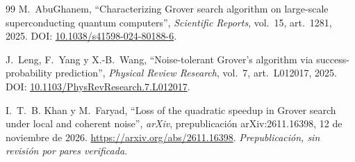 \documentclass[11pt,a4paper]{article}
\begin{document}
\begin{thebibliography}{99}
M.~AbuGhanem, ``Characterizing Grover search algorithm on large-scale superconducting quantum computers'', \emph{Scientific Reports}, vol.~15, art.~1281, 2025. DOI: \href{https://doi.org/10.1038/s41598-024-80188-6}{10.1038/s41598-024-80188-6}.

J.~Leng, F.~Yang y X.-B.~Wang, ``Noise-tolerant Grover's algorithm via success-probability prediction'', \emph{Physical Review Research}, vol.~7, art.~L012017, 2025. DOI: \href{https://doi.org/10.1103/PhysRevResearch.7.L012017}{10.1103/PhysRevResearch.7.L012017}.

I.~T.~B. Khan y M.~Faryad, ``Loss of the quadratic speedup in Grover search under local and coherent noise'', \emph{arXiv}, prepublicación arXiv:2611.16398, 12 de noviembre de 2026. \url{https://arxiv.org/abs/2611.16398}. \emph{Prepublicación, sin revisión por pares verificada}.
\end{thebibliography}
\end{document}

